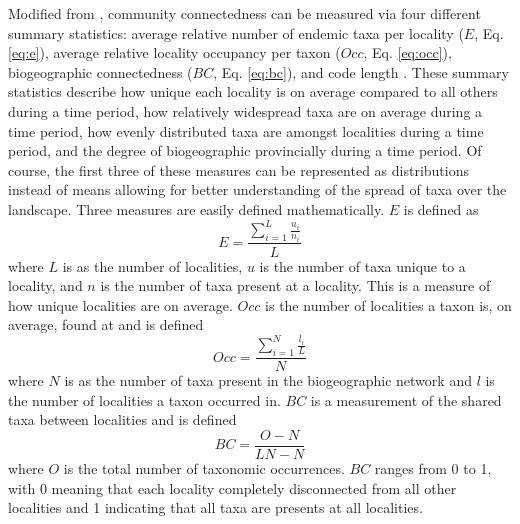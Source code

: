 \documentclass[12pt,letterpaper]{article}
\begin{document}
Modified from \citet{Sidor2013}, community connectedness can be measured via four different summary statistics: average relative number of endemic taxa per locality (\(E\), Eq. \ref{eq:e}), average relative locality occupancy per taxon (\(Occ\), Eq. \ref{eq:occ}), biogeographic connectedness (\(BC\), Eq. \ref{eq:bc}), and code length \citep{Rosvall2008,Rosvall2009a,Sidor2013}. These summary statistics describe how unique each locality is on average compared to all others during a time period, how relatively widespread taxa are on average during a time period, how evenly distributed taxa are amongst localities during a time period, and the degree of biogeographic provincially during a time period. Of course, the first three of these measures can be represented as distributions instead of means allowing for better understanding of the spread of taxa over the landscape. 
Three measures are easily defined mathematically. \(E\) is defined as 
\begin{equation}
  E = \frac{\sum_{i = 1}^{L} \frac{u_{i}}{n_{i}}}{L}
  \label{eq:e}
\end{equation}
where \(L\) is as the number of localities, \(u\) is the number of taxa unique to a locality, and \(n\) is the number of taxa present at a locality. This is a measure of how unique localities are on average. \(Occ\) is the number of localities a taxon is, on average, found at and is defined
\begin{equation}
  Occ = \frac{\sum_{i = 1}^{N} \frac{l_{i}}{L}}{N}
  \label{eq:occ}
\end{equation}
where \(N\) is as the number of taxa present in the biogeographic network and \(l\) is the number of localities a taxon occurred in. \(BC\) is a measurement of the shared taxa between localities and is defined 
\begin{equation}
  BC = \frac{O - N}{LN - N}
  \label{eq:bc}
\end{equation}
where \(O\) is the total number of taxonomic occurrences. \(BC\) ranges from 0 to 1, with 0 meaning that each locality completely disconnected from all other localities and 1 indicating that all taxa are presents at all localities. 
\end{document}
